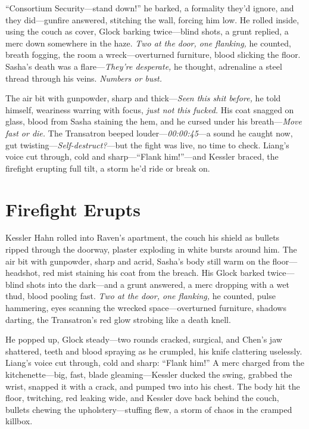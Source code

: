 \documentclass[12pt]{book}
\begin{document}
“Consortium Security—stand down!” he barked, a formality they’d ignore, and they did—gunfire answered, stitching the wall, forcing him low. He rolled inside, using the couch as cover, Glock barking twice—blind shots, a grunt replied, a merc down somewhere in the haze. \textit{Two at the door, one flanking,} he counted, breath fogging, the room a wreck—overturned furniture, blood slicking the floor. Sasha’s death was a flare—\textit{They’re desperate,} he thought, adrenaline a steel thread through his veins. \textit{Numbers or bust.}

The air bit with gunpowder, sharp and thick—\textit{Seen this shit before,} he told himself, weariness warring with focus, \textit{just not this fucked.} His coat snagged on glass, blood from Sasha staining the hem, and he cursed under his breath—\textit{Move fast or die.} The Transatron beeped louder—\textit{00:00:45}—a sound he caught now, gut twisting—\textit{Self-destruct?}—but the fight was live, no time to check. Liang’s voice cut through, cold and sharp—“Flank him!”—and Kessler braced, the firefight erupting full tilt, a storm he’d ride or break on.

\section{Firefight Erupts}

Kessler Hahn rolled into Raven’s apartment, the couch his shield as bullets ripped through the doorway, plaster exploding in white bursts around him. The air bit with gunpowder, sharp and acrid, Sasha’s body still warm on the floor—headshot, red mist staining his coat from the breach. His Glock barked twice—blind shots into the dark—and a grunt answered, a merc dropping with a wet thud, blood pooling fast. \textit{Two at the door, one flanking,} he counted, pulse hammering, eyes scanning the wrecked space—overturned furniture, shadows darting, the Transatron’s red glow strobing like a death knell.

He popped up, Glock steady—two rounds cracked, surgical, and Chen’s jaw shattered, teeth and blood spraying as he crumpled, his knife clattering uselessly. Liang’s voice cut through, cold and sharp: “Flank him!” A merc charged from the kitchenette—big, fast, blade gleaming—Kessler ducked the swing, grabbed the wrist, snapped it with a crack, and pumped two into his chest. The body hit the floor, twitching, red leaking wide, and Kessler dove back behind the couch, bullets chewing the upholstery—stuffing flew, a storm of chaos in the cramped killbox.
\end{document}
